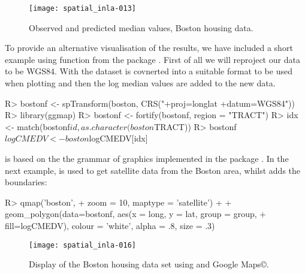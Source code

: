 \documentclass[article]{jss}
\begin{document}
\begin{figure}[h!]
\begin{center}
\texttt{[image: spatial\_inla-013]}
\end{center}
\caption{Observed and predicted median values, Boston housing data.}
\label{fig:spplot}
\end{figure}

To provide an alternative visualisation of the results, we have included a
short example using function  from the  package
\citep{KahleWickham:2013}.  First of all we will reproject our data to be
WGS84. With  the  dataset is covnerted into a
suitable format to be used when plotting and then the log median values are
added to the new data.



\begin{Schunk}
\begin{Sinput}
R> bostonf <- spTransform(boston, CRS("+proj=longlat +datum=WGS84"))
R> library(ggmap)
R> bostonf <- fortify(bostonf, region = "TRACT")
R> idx <- match(bostonf$id, as.character(boston$TRACT))
R> bostonf$logCMEDV <- boston$logCMEDV[idx]
\end{Sinput}
\end{Schunk}
\noindent
{} is based on the the grammar of graphics implemented in the
 package \citep{Wickham:2009}. In the next example,
 is used to get satellite data from the Boston area,
whilst  adds the boundaries:

\begin{Schunk}
\begin{Sinput}
R> qmap('boston',
+     zoom = 10, maptype = 'satellite') +
+  geom_polygon(data=bostonf, aes(x = long, y = lat, group = group, 
+     fill=logCMEDV), colour = 'white', alpha = .8, size = .3)
\end{Sinput}
\end{Schunk}

\begin{figure}[h!]
\begin{center}
\texttt{[image: spatial\_inla-016]}
\caption{Display of the Boston housing data set using 
and Google Maps\copyright.} 
\label{fig:ggmap}
\end{center}
\end{figure}
\end{document}
